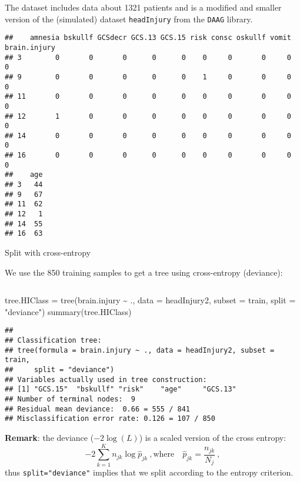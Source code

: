 \documentclass[
  10pt,
  ignorenonframetext,
]{beamer}
\newenvironment{Shaded}{\begin{snugshade}}{\end{snugshade}}
\newcommand{\AttributeTok}[1]{\textcolor[rgb]{0.77,0.63,0.00}{#1}}
\newcommand{\FunctionTok}[1]{\textcolor[rgb]{0.00,0.00,0.00}{#1}}
\newcommand{\NormalTok}[1]{#1}
\newcommand{\OtherTok}[1]{\textcolor[rgb]{0.56,0.35,0.01}{#1}}
\newcommand{\SpecialCharTok}[1]{\textcolor[rgb]{0.00,0.00,0.00}{#1}}
\newcommand{\StringTok}[1]{\textcolor[rgb]{0.31,0.60,0.02}{#1}}
\begin{document}
\begin{frame}[fragile]
The dataset includes data about 1321 patients and is a modified and
smaller version of the (simulated) dataset \texttt{headInjury} from the
\texttt{DAAG} library.

\scriptsize

\begin{verbatim}
##    amnesia bskullf GCSdecr GCS.13 GCS.15 risk consc oskullf vomit brain.injury
## 3        0       0       0      0      0    0     0       0     0            0
## 9        0       0       0      0      0    1     0       0     0            0
## 11       0       0       0      0      0    0     0       0     0            0
## 12       1       0       0      0      0    0     0       0     0            0
## 14       0       0       0      0      0    0     0       0     0            0
## 16       0       0       0      0      0    0     0       0     0            0
##    age
## 3   44
## 9   67
## 11  62
## 12   1
## 14  55
## 16  63
\end{verbatim}

\normalsize
\end{frame}

\begin{frame}[fragile]
\begin{block}{Split with cross-entropy}
\protect\hypertarget{split-with-cross-entropy}{}
\(~\)

We use the 850 training samples to get a tree using cross-entropy
(deviance):

\(~\)

\scriptsize

\begin{Shaded}
\begin{Highlighting}[]
\NormalTok{tree.HIClass }\OtherTok{=} \FunctionTok{tree}\NormalTok{(brain.injury }\SpecialCharTok{\textasciitilde{}}\NormalTok{ ., }\AttributeTok{data =}\NormalTok{ headInjury2, }\AttributeTok{subset =}\NormalTok{ train,}
    \AttributeTok{split =} \StringTok{"deviance"}\NormalTok{)}
\FunctionTok{summary}\NormalTok{(tree.HIClass)}
\end{Highlighting}
\end{Shaded}

\begin{verbatim}
## 
## Classification tree:
## tree(formula = brain.injury ~ ., data = headInjury2, subset = train, 
##     split = "deviance")
## Variables actually used in tree construction:
## [1] "GCS.15"  "bskullf" "risk"    "age"     "GCS.13" 
## Number of terminal nodes:  9 
## Residual mean deviance:  0.66 = 555 / 841 
## Misclassification error rate: 0.126 = 107 / 850
\end{verbatim}

\vspace{6mm}

\textbf{Remark}: the deviance (\(-2\log(L)\)) is a scaled version of the
cross entropy:
\[-2\sum_{k=1}^K n_{jk} \log\hat{p}_{jk}\ , \text{where} \quad   \hat{p}_{jk}=\frac{n_{jk}}{N_j}\ , \]
thus \texttt{split="deviance"} implies that we split according to the
entropy criterion.
\end{block}
\end{frame}
\end{document}
